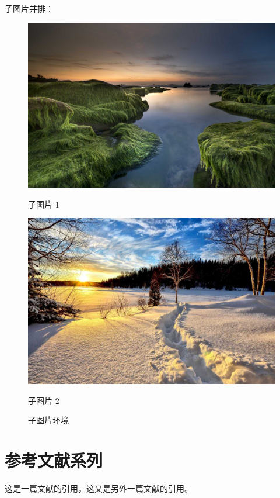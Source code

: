 \documentclass[UTF8,hyperref,space=auto]{ctexart} %
\theoremstyle{plain}
\theoremstyle{plain}
\theoremstyle{plain}
\theoremstyle{plain}
\theoremstyle{nonumberplain}
\begin{document}
子图片并排：
\begin{figure}[H]
	\centering
	\begin{subtable}[t]{0.4\textwidth}
		\centering
		\includegraphics[width=\textwidth]{2.jpg}
		\caption{子图片 1}
	\end{subtable}
	\quad
	\begin{subtable}[t]{0.4\textwidth}
		\centering
		\includegraphics[width=\textwidth]{3.jpg}
		\caption{子图片 2}
	\end{subtable}
	\caption{子图片环境}
\end{figure}

\section{参考文献系列}
这是一篇文献的引用\citep{ChamonLiu-439}，这又是另外一篇文献的引用\citep{李静潘丽群-420}。
\end{document}
